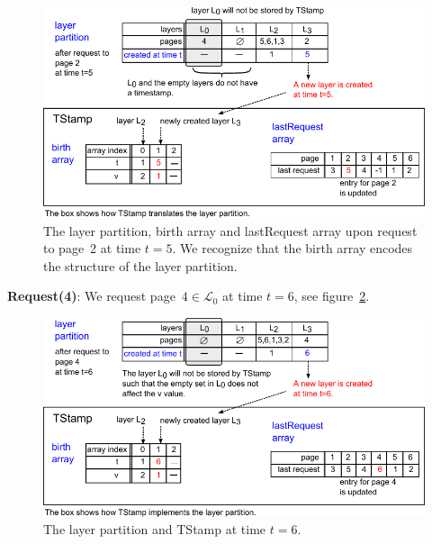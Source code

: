 \documentclass[a4paper,12pt, titlepage]{article}  %
\newcommand{\cl}{\mathcal{L}}   %
\begin{document}
\begin{figure}[htp]
	\centering
	\includegraphics[scale=1.0]{./figures/TStamp_request_t5.pdf}
	\caption{The layer partition, birth array and lastRequest array upon request to page~2 at time $t=5$.
                     We recognize that the birth array encodes the structure of the layer partition.} 
	\label{fig:TStamp_request_t5}
\end{figure}

\newpage
\noindent \textbf{Request(4)}: We request page~$4\in \cl_0$ at time $t=6$, see figure~\ref{fig:TStamp_request_t6}.
\begin{figure}[htp]
	\centering
	\includegraphics[scale=0.95]{./figures/TStamp_request_t6.pdf}
	\caption{The layer partition and TStamp at time $t=6$.} 
	\label{fig:TStamp_request_t6}
\end{figure}
\end{document}
